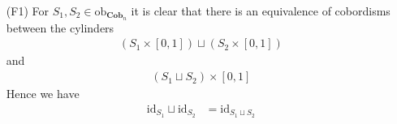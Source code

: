 \begin{prf}
\begin{enumerate}
\item[(F1)]
For $S_{1},S_{2} \in \mathrm{ob}_{\mathbf{Cob}_{n}}$ it is clear that there is an equivalence of cobordisms between the cylinders
\begin{align*}
  \left(
    S_{1}
    \times
    [0,1]
  \right)
  \sqcup
  \left(
    S_{2}
    \times
    [0,1]
  \right)
\end{align*}
and
\begin{align*}
  \left(
    S_{1}
    \sqcup
    S_{2}
  \right)
  \times
  [0,1]
\end{align*}
Hence we have
\begin{align*}
  \mathrm{id}_{S_{1}}
  \sqcup
  \mathrm{id}_{S_{2}}
  &=
  \mathrm{id}_{S_{1} \sqcup S_{2}}
\end{align*}


\end{enumerate}
\end{prf}
